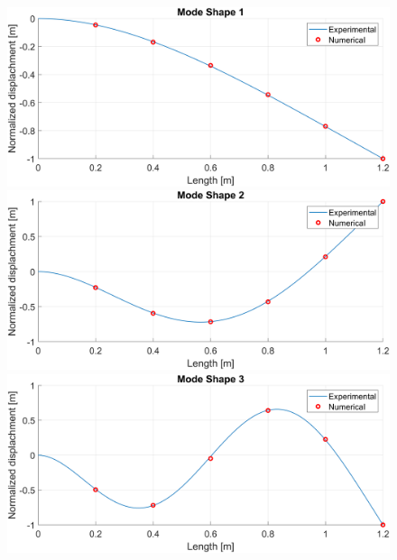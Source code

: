 \begin{figure}[H]
    \begin{minipage}[b]{0.45\textwidth}
        \centering
        \includegraphics[width=\textwidth]{img/MATLAB/Part_A/Comparison_ModeShape_01.png}
    \end{minipage}
    \hfill
    \begin{minipage}[b]{0.45\textwidth}
        \centering
        \includegraphics[width=\textwidth]{img/MATLAB/Part_A/Comparison_ModeShape_02.png}
    \end{minipage}
    \begin{minipage}[b]{0.45\textwidth}
        \centering
        \includegraphics[width=\textwidth]{img/MATLAB/Part_A/Comparison_ModeShape_03.png}
    \end{minipage}

\end{figure}
